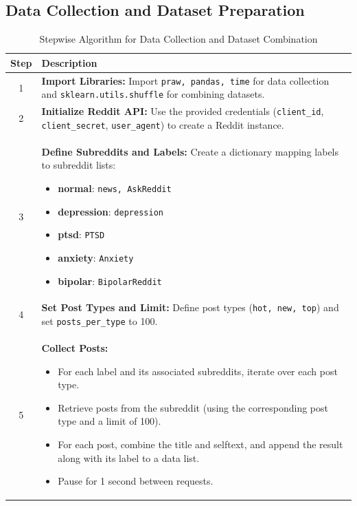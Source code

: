 \subsection{Data Collection and Dataset Preparation}
\begin{table}[H]
    \centering
    \caption*{Stepwise Algorithm for Data Collection and Dataset Combination}
    \label{tab:algorithm}
    \begin{tabularx}{\textwidth}{|c|X|}
        \hline
        \textbf{Step} & \textbf{Description} \\
        \hline
        1 & \textbf{Import Libraries:} Import \texttt{praw, pandas, time} for data collection and \texttt{sklearn.utils.shuffle} for combining datasets. \\
        \hline
        2 & \textbf{Initialize Reddit API:} Use the provided credentials (\texttt{client\_id}, \texttt{client\_secret}, \texttt{user\_agent}) to create a Reddit instance. \\
        \hline
        3 & \textbf{Define Subreddits and Labels:} Create a dictionary mapping labels to subreddit lists:
            \begin{itemize}[noitemsep, topsep=0pt]
                \item \textbf{normal}: \texttt{news, AskReddit}
                \item \textbf{depression}: \texttt{depression}
                \item \textbf{ptsd}: \texttt{PTSD}
                \item \textbf{anxiety}: \texttt{Anxiety}
                \item \textbf{bipolar}: \texttt{BipolarReddit}
            \end{itemize} \\
        \hline
        4 & \textbf{Set Post Types and Limit:} Define post types (\texttt{hot, new, top}) and set \texttt{posts\_per\_type} to 100. \\
        \hline
        5 & \textbf{Collect Posts:}
            \begin{itemize}[noitemsep, topsep=0pt]
                \item For each label and its associated subreddits, iterate over each post type.
                \item Retrieve posts from the subreddit (using the corresponding post type and a limit of 100).
                \item For each post, combine the title and selftext, and append the result along with its label to a data list.
                \item Pause for 1 second between requests.
            \end{itemize} \\
        \hline
    \end{tabularx}
\end{table}

